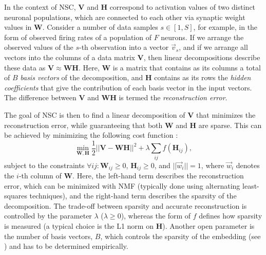 In the context of \ac{NSC},
\textbf{V} and \textbf{H} correspond to activation values
of two distinct neuronal populations,
which are connected to each other via synaptic weight values
in \textbf{W}.
Consider a number of data samples $s \in [1, S]$, for example,
in the form of observed firing rates of a population of $F$ neurons.
If we arrange the observed values of the $s$-th observation 
into a vector $\vec{v}_s$,
and if we arrange all vectors into the columns of a data matrix \textbf{V},
then linear decompositions describe these data as
$\mathbf{V} \approx \mathbf{WH}$.
Here, \textbf{W} is a matrix that contains as its columns
a total of $B$ \emph{basis vectors} of the decomposition, 
and \textbf{H} contains as its rows the \emph{hidden coefficients}
that give the contribution of each basis vector in the input vectors.
The difference between \textbf{V} and \textbf{WH} is termed
the \emph{reconstruction error}.

The goal of \ac{NSC} is then to find a linear decomposition of \textbf{V}
that minimizes the reconstruction error,
while guaranteeing that both \textbf{W} and \textbf{H} are sparse.
This can be achieved by minimizing the following cost function
\cite{Hoyer2002}:
\begin{equation}
\min_{\mathbf{W}, \mathbf{H}} \frac{1}{2} ||\mathbf{V} -\mathbf{WH}||^2 + \lambda \sum_{ij} f(\mathbf{H}_{ij}),
\end{equation}
subject to the constraints
$\forall ij: \mathbf{W}_{ij} \geq 0$, $\mathbf{H}_{ij} \geq 0$, and
$||\vec{w}_i|| = 1$, where $\vec{w}_i$ denotes the $i$-th column of \textbf{W}.
Here, the left-hand term describes the reconstruction error, which can
be minimized with \ac{NMF}
(typically done using alternating least-squares techniques),
and the right-hand term describes the sparsity of the decomposition.
The trade-off between sparsity and accurate reconstruction
is controlled by the parameter $\lambda$ ($\lambda \geq 0$), whereas
the form of $f$ defines how sparsity is measured
(a typical choice is the L1 norm on \textbf{H}).
Another open parameter is the number of basis vectors, $B$, which controls the sparsity of the embedding (see \cite{Beyeler2016}) and has to be
determined empirically.


